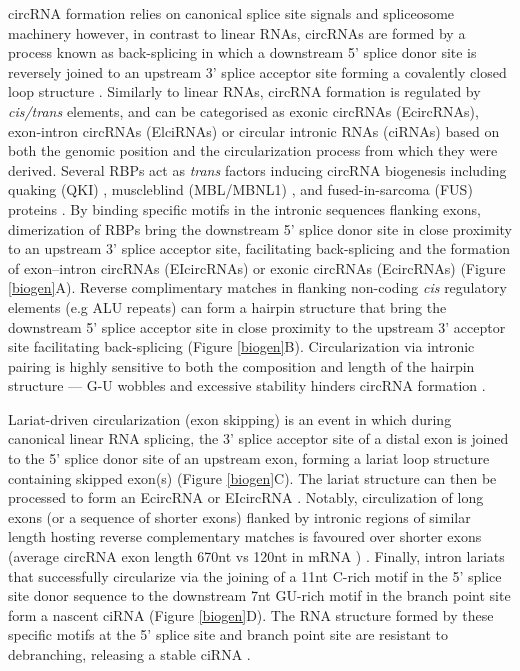 \documentclass[pdflatex,sn-mathphys-num]{sn-jnl}
\begin{document}
circRNA formation relies on canonical splice site signals and spliceosome machinery \cite{Starke2015Jan} however, in contrast to linear RNAs, circRNAs are formed by a process known as back-splicing in which a downstream 5' splice donor site is reversely joined to an upstream 3' splice acceptor site forming a covalently closed loop structure \cite{Jeck2012Dec, Jeck2014May}. Similarly to linear RNAs, circRNA formation is regulated by \textit{cis/trans} elements, and can be categorised as exonic circRNAs (EcircRNAs), exon-intron circRNAs (ElciRNAs) or circular intronic RNAs (ciRNAs) based on both the genomic position and the circularization process from which they were derived. Several RBPs act as \textit{trans} factors inducing circRNA biogenesis including quaking (QKI) \cite{Conn2015Mar}, muscleblind (MBL/MBNL1) \cite{Ashwal-Fluss2014Oct}, and fused-in-sarcoma (FUS) proteins \cite{Errichelli2017Mar}. By binding specific motifs in the intronic sequences flanking exons, dimerization of RBPs bring the downstream 5' splice donor site in close proximity to an upstream 3' splice acceptor site, facilitating back-splicing and the formation of exon–intron circRNAs (EIcircRNAs) or exonic circRNAs (EcircRNAs) (Figure \ref{biogen}A). Reverse complimentary matches in flanking non-coding \textit{cis} regulatory elements (e.g ALU repeats) can form a hairpin structure that bring the downstream 5' splice acceptor site in close proximity to the upstream 3' acceptor site facilitating back-splicing \cite{Jeck2012Dec, Wilusz2015May, CIRCexplorer} (Figure \ref{biogen}B). Circularization via intronic pairing is highly sensitive to both the composition and length of the hairpin structure --- G-U wobbles and excessive stability hinders circRNA formation \cite{Liang2014Oct}. \par

Lariat-driven circularization (exon skipping) is an event in which during canonical linear RNA splicing, the 3' splice acceptor site of a distal exon is joined to the 5' splice donor site of an upstream exon, forming a lariat loop structure containing skipped exon(s) (Figure \ref{biogen}C). The lariat structure can then be processed to form an EcircRNA or EIcircRNA \cite{Zaphiropoulos1996}. Notably, circulization of long exons (or a sequence of shorter exons) flanked by intronic regions of similar length hosting reverse complementary matches is favoured over shorter exons (average circRNA exon length 670nt \cite{Jeck2012Dec} vs 120nt in mRNA \cite{Mokry2010Jun}) \cite{Li2019Sep,Pisignano2023Sep}. Finally, intron lariats that successfully circularize via the joining of a 11nt C-rich motif in the 5' splice site donor sequence to the downstream 7nt GU-rich motif in the branch point site form a nascent ciRNA (Figure \ref{biogen}D). The RNA structure formed by these specific motifs at the 5' splice site and branch point site are resistant to debranching, releasing a stable ciRNA \cite{Zhang2013Sep,Talhouarne2014Jul}.
\end{document}
